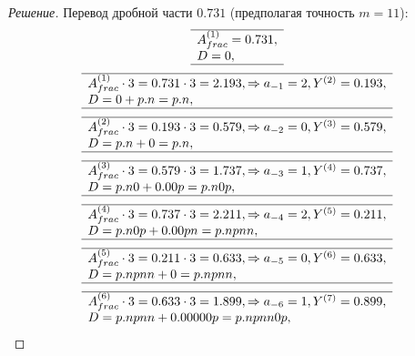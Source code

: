 \begin{proof}[Решение]
    Перевод дробной части $0.731$ (предполагая точность $m=11$):
    \[
        \begin{array}[c]{l}
            \hline
            A_{frac}^{(1)}=0.731, \\
            D=0,\\ 
            \hline
        \end{array}
    \]
    \[
        \begin{array}[c]{l}
            \hline
            A_{frac}^{(1)}\cdot 3=0.731\cdot 3=2.193, \Rightarrow a_{-1}=2, Y^{(2)}=0.193, \\ 
            D=0+p.n=p.n,\\ 
            \hline
        \end{array}
    \]
    \[
        \begin{array}[c]{l}
            \hline
            A_{frac}^{(2)}\cdot 3=0.193\cdot 3=0.579,\Rightarrow a_{-2}=0, Y^{(3)}=0.579, \\
            D=p.n+0=p.n,\\
            \hline
        \end{array}
    \]
    \[
        \begin{array}[c]{l}
            \hline
            A_{frac}^{(3)}\cdot 3=0.579\cdot 3=1.737,\Rightarrow a_{-3}=1, Y^{(4)}=0.737, \\
            D=p.n0+0.00p=p.n0p,\\
            \hline
        \end{array}
    \]
    \[
        \begin{array}[c]{l}
            \hline
            A_{frac}^{(4)}\cdot 3=0.737\cdot 3=2.211,\Rightarrow a_{-4}=2, Y^{(5)}=0.211, \\
            D=p.n0p+0.00pn=p.npnn,\\
            \hline
        \end{array}
    \]
    \[
        \begin{array}[c]{l}
            \hline
            A_{frac}^{(5)}\cdot 3=0.211\cdot 3=0.633,\Rightarrow a_{-5}=0, Y^{(6)}=0.633, \\
            D=p.npnn+0=p.npnn,\\
            \hline
        \end{array}
    \]
    \[
        \begin{array}[c]{l}
            \hline
            A_{frac}^{(6)}\cdot 3=0.633\cdot 3=1.899,\Rightarrow a_{-6}=1, Y^{(7)}=0.899, \\
            D=p.npnn+0.00000p=p.npnn0p,\\

\end{array}\]
\end{proof}
